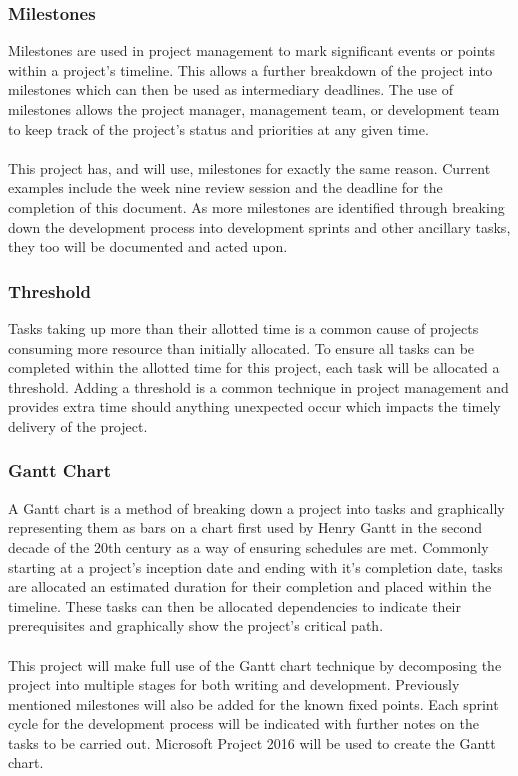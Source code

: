 	\subsubsection{Milestones}
		Milestones are used in project management to mark significant events or points within a project’s timeline. This allows a further breakdown of the project into  milestones which can then be used as intermediary  deadlines. The use of milestones allows the project manager, management team, or development team to keep track of the project’s status and priorities at any given time.
		\\\\
		This project has, and will use, milestones for exactly the same reason. Current examples include the week nine review session and the deadline for the completion of this document. As more milestones are identified through breaking down the development process into development sprints and other ancillary tasks, they too will be documented and acted upon.
	\subsubsection{Threshold}
		Tasks taking up  more than their allotted time is a common cause of projects consuming  more  resource than initially allocated. To ensure all tasks can be completed within the allotted time for this project, each task will be allocated a threshold. Adding a threshold is a common technique in project management and provides extra time should anything unexpected occur which impacts the timely delivery of the project.
	\subsubsection{Gantt Chart}
		A Gantt chart is a method of breaking down a project into tasks and graphically representing them as bars on a chart first used by Henry Gantt in the second decade of the 20th century as a way of ensuring schedules are met. Commonly starting at a project’s inception date and ending with it’s completion date, tasks are allocated an estimated duration for their completion and placed within the timeline. These tasks can then be allocated dependencies to indicate their prerequisites and graphically show the project’s critical path.
		\\\\
		This project will make full use of the Gantt chart technique by decomposing  the project into multiple stages for both writing and development. Previously mentioned milestones will also be added for the known fixed points. Each sprint cycle for the development process will be indicated with further notes on the tasks to be carried out. Microsoft Project 2016 will be used to create the Gantt chart.
